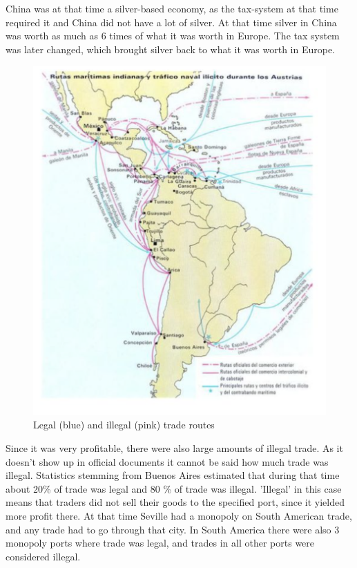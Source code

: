 \documentclass{article}
\begin{document}
	China was at that time a silver-based economy, as the tax-system at that time required it and China did not have a lot of silver. At that time silver in China was worth as much as 6 times of what it was worth in Europe. The tax system was later changed, which brought silver back to what it was worth in Europe. \\

	\begin{figure}
	\hspace{-2cm}
	\includegraphics[scale=0.6]{Illegal_Trade.png}
	\caption{Legal (blue) and illegal (pink) trade routes}
	\end{figure}


	Since it was very profitable, there were also large amounts of illegal trade. As it doesn't show up in official documents it cannot be said how much trade was illegal. Statistics stemming from Buenos Aires estimated that during that time about 20\% of trade was legal and 80 \% of trade was illegal. 'Illegal' in this case means that traders did not sell their goods to the specified port, since it yielded more profit there. At that time Seville had a monopoly on South American trade, and any trade had to go through that city. In South America there were also 3 monopoly ports where trade was legal, and trades in all other ports were considered illegal. \\
\end{document}
